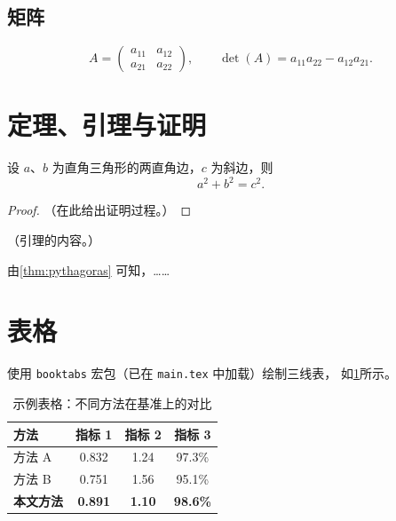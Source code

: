 \subsection{矩阵}

\begin{equation}
  A = \begin{pmatrix} a_{11} & a_{12} \\ a_{21} & a_{22} \end{pmatrix},
  \qquad
  \det(A) = a_{11}a_{22} - a_{12}a_{21}.
\end{equation}

\section{定理、引理与证明}


\begin{theorem}[勾股定理]\label{thm:pythagoras}
  设 $a$、$b$ 为直角三角形的两直角边，$c$ 为斜边，则
  \[
    a^2 + b^2 = c^2.
  \]
\end{theorem}

\begin{proof}
  （在此给出证明过程。）
\end{proof}

\begin{lemma}\label{lem:example}
  （引理的内容。）
\end{lemma}

\begin{corollary}
  由\cref{thm:pythagoras} 可知，……
\end{corollary}

\section{表格}

使用 \texttt{booktabs} 宏包（已在 \texttt{main.tex} 中加载）绘制三线表，
如\cref{tab:example}所示。

\begin{table}[htbp]
  \centering
  \caption{示例表格：不同方法在基准上的对比}
  \label{tab:example}
  \begin{tabular}{l c c c}
    \toprule
    方法           & 指标 1 & 指标 2 & 指标 3 \\
    \midrule
    方法 A         & 0.832  & 1.24   & 97.3\% \\
    方法 B         & 0.751  & 1.56   & 95.1\% \\
    \textbf{本文方法} & \textbf{0.891} & \textbf{1.10} & \textbf{98.6\%} \\
    \bottomrule
  \end{tabular}
\end{table}

